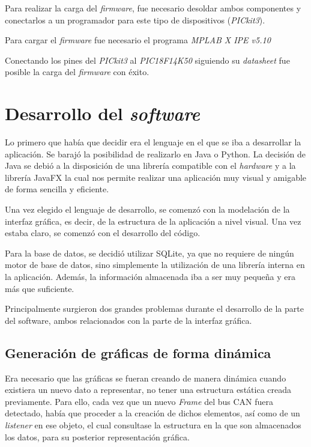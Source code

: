 Para realizar la carga del \emph{firmware}, fue necesario desoldar ambos componentes y conectarlos a un programador para este tipo de dispositivos (\emph{PICkit3}\cite{pickit}).

Para cargar el \emph{firmware} fue necesario el programa \emph{MPLAB X IPE v5.10}\cite{mplab}

Conectando los pines del \emph{PICkit3} al \emph{PIC18F14K50} siguiendo su \emph{datasheet}\cite{pic18} fue posible la carga del \emph{firmware} con éxito.

\section{Desarrollo del \emph{software}}

Lo primero que había que decidir era el lenguaje en el que se iba a desarrollar la aplicación. Se barajó la posibilidad de realizarlo en Java o Python. La decisión de Java se debió a la disposición de una librería compatible con el \emph{hardware} y a la librería JavaFX la cual nos permite realizar una aplicación muy visual y amigable de forma sencilla y eficiente.

Una vez elegido el lenguaje de desarrollo, se comenzó con la modelación de la interfaz gráfica, es decir, de la estructura de la aplicación a nivel visual. Una vez estaba claro, se comenzó con el desarrollo del código.

Para la base de datos, se decidió utilizar SQLite, ya que no requiere de ningún motor de base de datos, sino simplemente la utilización de una librería interna en la aplicación. Además, la información almacenada iba a ser muy pequeña y era más que suficiente.

Principalmente surgieron dos grandes problemas durante el desarrollo de la parte del software, ambos relacionados con la parte de la interfaz gráfica.

\subsection{Generación de gráficas de forma dinámica}\label{generacion_de_graficas_de_forma_dinamica}

Era necesario que las gráficas se fueran creando de manera dinámica cuando existiera un nuevo dato a representar, no tener una estructura estática creada previamente. Para ello, cada vez que un nuevo \emph{Frame} del bus CAN fuera detectado, había que proceder a la creación de dichos elementos, así como de un \emph{listener} en ese objeto, el cual consultase la estructura en la que son almacenados los datos, para su posterior representación gráfica.

